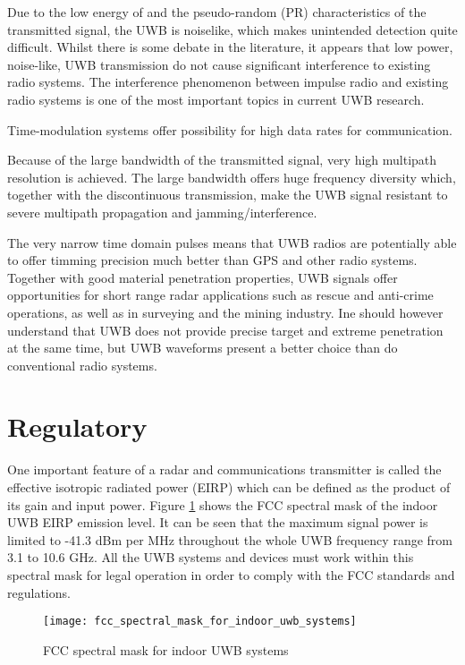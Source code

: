 \documentclass[../../main.tex]{subfiles}
\begin{document}
Due to the low energy of and the pseudo-random (PR) characteristics of the transmitted signal, the UWB is noiselike, which makes unintended detection quite difficult. Whilst there is some debate in the literature, it appears that low power, noise-like, UWB transmission do not cause significant interference to existing radio systems. The interference phenomenon between impulse radio and existing radio systems is one of the most important topics in current UWB research.

Time-modulation systems offer possibility for high data rates for communication. 

Because of the large bandwidth of the transmitted signal, very high multipath resolution is achieved. The large bandwidth offers huge frequency diversity which, together with the discontinuous transmission, make the UWB signal resistant to severe multipath propagation and jamming/interference. 

The very narrow time domain pulses means that UWB radios are potentially able to offer timming precision much better than GPS and other radio systems. Together with good material penetration properties, UWB signals offer opportunities for short range radar applications such as rescue and anti-crime operations, as well as in surveying and the mining industry. Ine should however understand that UWB does not provide precise target and extreme penetration at the same time, but UWB waveforms present a better choice than do conventional radio systems.

\section{Regulatory}

One important feature of a radar and communications transmitter is called the effective isotropic radiated power (EIRP) which can be defined as the product of its gain and input power. Figure \ref{fig:fcc_spectral_mask_for_indoor_uwb_systems} shows the FCC spectral mask of the indoor UWB EIRP emission level. It can be seen that the maximum signal power is limited to -41.3 dBm per MHz throughout the whole UWB frequency range from 3.1 to 10.6 GHz. All the UWB systems and devices must work within this spectral mask for legal operation in order to comply with the FCC standards and regulations.

\begin{figure}[h]
    \centering
    \texttt{[image: fcc\_spectral\_mask\_for\_indoor\_uwb\_systems]}
    \caption{FCC spectral mask for indoor UWB systems}
    \label{fig:fcc_spectral_mask_for_indoor_uwb_systems}
\end{figure}
\end{document}
